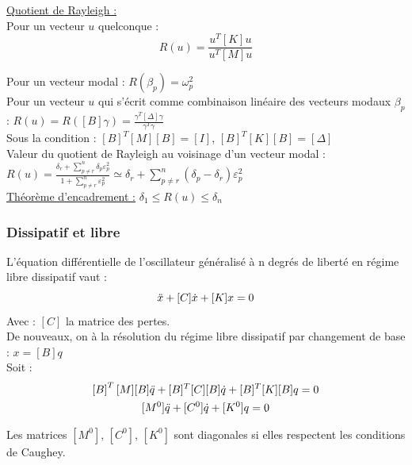 \documentclass[../main.tex]{subfiles}
\begin{document}
\quad \underline{Quotient de Rayleigh :}\\
Pour un vecteur $u$ quelconque : \begin{equation}
    R(u) = \frac{u^T[K] u}{u^T[M]u}
\end{equation}

Pour un vecteur modal : $R(\beta_p) = \omega_p^2$\\

Pour un vecteur $u$ qui s'écrit comme combinaison linéaire des vecteurs modaux $\beta_p$ : $R(u) = R([B]\gamma) = \frac{\gamma^T[\Delta]\gamma}{\gamma^T\gamma}$\\
Sous la condition : $[B]^T[M][B] = [I]$, $[B]^T[K][B] = [\Delta]$\\

Valeur du quotient de Rayleigh au voisinage d'un vecteur modal : $R(u) = \frac{\delta_r + \sum_{p\neq r}^n \delta_p \varepsilon_p^2}{1+\sum_{p\neq r}^n \varepsilon_p^2} \simeq \delta_r + \sum_{p\neq r}^n (\delta_p-\delta_r)\varepsilon_p^2$\\

\quad \underline{Théorème d'encadrement :} $\delta_1 \leq R(u) \leq \delta_n$

\subsubsection{Dissipatif et libre}
L'équation différentielle de l'oscillateur généralisé à n degrés de liberté en régime libre dissipatif vaut : \begin{equation}
    [M]\Ddot{x} + [C] \dot{x} + [K]x = 0
\end{equation}
Avec : $[C]$ la matrice des pertes.\\

De nouveaux, on à la résolution du régime libre dissipatif par changement de base : $x = [B]q$\\

Soit : \begin{equation}
\begin{gathered}
    \left[B\right]^T[M][B]\Ddot{q} + [B]^T[C][B]\dot{q} + [B]^T[K][B]q = 0\\
    [M^0] \Ddot{q} + [C^0]\dot{q} + [K^0]q = 0\\
    \end{gathered}
\end{equation}

\warning Les matrices $[M^0]$, $[C^0]$, $[K^0]$ sont diagonales si elles respectent les conditions de Caughey.\\
\end{document}
